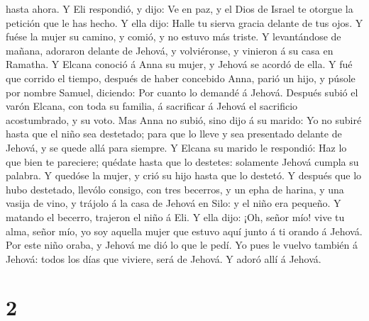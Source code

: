 hasta ahora.  Y Eli respondió, y dijo: Ve en paz, y el
Dios de Israel te otorgue la petición que le has hecho. 
Y ella dijo: Halle tu sierva gracia delante de tus ojos. Y fuése la
mujer su camino, y comió, y no estuvo más triste.  Y
levantándose de mañana, adoraron delante de Jehová, y volviéronse, y
vinieron á su casa en Ramatha. Y Elcana conoció á Anna su mujer, y
Jehová se acordó de ella.  Y fué que corrido el tiempo,
después de haber concebido Anna, parió un hijo, y púsole por nombre
Samuel, diciendo: Por cuanto lo demandé á Jehová. 
Después subió el varón Elcana, con toda su familia, á sacrificar á
Jehová el sacrificio acostumbrado, y su voto.  Mas Anna
no subió, sino dijo á su marido: Yo no subiré hasta que el niño sea
destetado; para que lo lleve y sea presentado delante de Jehová, y se
quede allá para siempre.  Y Elcana su marido le
respondió: Haz lo que bien te pareciere; quédate hasta que lo destetes:
solamente Jehová cumpla su palabra. Y quedóse la mujer, y crió su hijo
hasta que lo destetó.  Y después que lo hubo destetado,
llevólo consigo, con tres becerros, y un epha de harina, y una vasija de
vino, y trájolo á la casa de Jehová en Silo: y el niño era pequeño.
 Y matando el becerro, trajeron el niño á Eli.
 Y ella dijo: ¡Oh, señor mío! vive tu alma, señor mío, yo
soy aquella mujer que estuvo aquí junto á ti orando á Jehová.
 Por este niño oraba, y Jehová me dió lo que le pedí.
 Yo pues le vuelvo también á Jehová: todos los días que
viviere, será de Jehová. Y adoró allí á Jehová.

\hypertarget{section-1}{%
\section{2}\label{section-1}}

